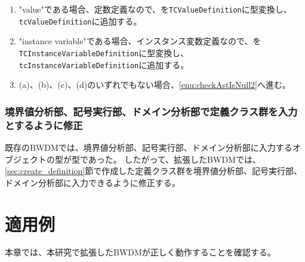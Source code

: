 \documentclass[uplatex, report, a4j, 10pt]{jsbook}
\newcommand\ttt[1]{\texttt{#1}}
\begin{document}
\begin{enumerate}
\begin{enumerate}
\begin{enumerate}
                \end{enumerate}
          \item "value"である場合、定数定義なので、\astDefinition{}を\ttt{TCValueDefinition}に型変換し、\ttt{tcValueDefinition}に追加する。
          \item "instance variable"である場合、インスタンス変数定義なので、\astDefinition{}を\ttt{TCInstanceVariableDefinition}に型変換し、\ttt{tcInstanceVariableDefinition}に追加する。
          \item (a)、(b)、(c)、(d)のいずれでもない場合、\ref{enu:checkAstIsNull2}へ進む。
        \end{enumerate}
\end{enumerate}

\subsection{境界値分析部、記号実行部、ドメイン分析部で定義クラス群を入力とするように修正}
既存のBWDMでは、境界値分析部、記号実行部、ドメイン分析部に入力するオブジェクトの型が\TCExplicitFunctionDefinition{}型であった。
したがって、拡張したBWDMでは、\ref{sec:create_definition}節で作成した定義クラス群を境界値分析部、記号実行部、ドメイン分析部に入力できるように修正する。

\chapter{適用例}\label{cha:Indication}
本章では、本研究で拡張したBWDMが正しく動作することを確認する。
\end{document}
